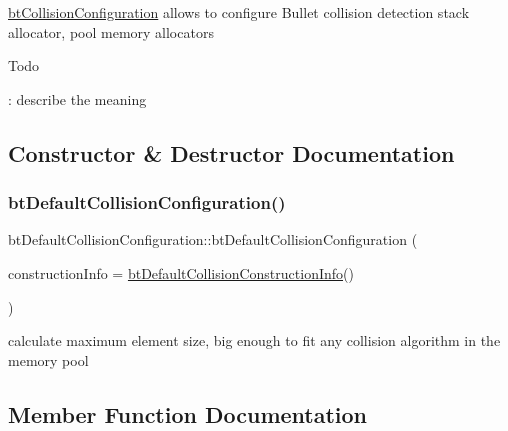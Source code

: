 \hyperlink{classbtCollisionConfiguration}{bt\+Collision\+Configuration} allows to configure Bullet collision detection stack allocator, pool memory allocators \begin{DoxyRefDesc}{Todo}
\item[\hyperlink{todo__todo000048}{Todo}]\+: describe the meaning \end{DoxyRefDesc}


\subsection{Constructor \& Destructor Documentation}
\mbox{\label{classbtDefaultCollisionConfiguration_ad08e7d72b0bd0d3f98290c2a1649b0d9}} 
\subsubsection{\texorpdfstring{bt\+Default\+Collision\+Configuration()}{btDefaultCollisionConfiguration()}}
{\footnotesize\ttfamily bt\+Default\+Collision\+Configuration\+::bt\+Default\+Collision\+Configuration (\begin{DoxyParamCaption}\item[{const \hyperlink{structbtDefaultCollisionConstructionInfo}{bt\+Default\+Collision\+Construction\+Info} \&}]{construction\+Info = {\ttfamily \hyperlink{structbtDefaultCollisionConstructionInfo}{bt\+Default\+Collision\+Construction\+Info}()} }\end{DoxyParamCaption})}

calculate maximum element size, big enough to fit any collision algorithm in the memory pool 

\subsection{Member Function Documentation}
\mbox{\label{classbtDefaultCollisionConfiguration_a39a173eedf0e8d55dd89ef3b637925a9}} 
